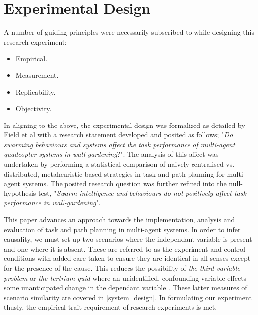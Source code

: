 \documentclass{report}
\begin{document}
\section{Experimental Design}
A number of guiding principles \cite{Field2012} were necessarily subscribed to while designing this research experiment:
\begin{itemize}
	\item Empirical.
	\item Measurement.
	\item Replicability.
	\item Objectivity.
\end{itemize}

In aligning to the above, the experimental design was formalized as detailed by Field et al \cite{Field2012} with a research statement developed and posited as follows; "\textit{Do swarming behaviours and systems affect the task performance of multi-agent quadcopter systems in wall-gardening}?". The analysis of this affect was undertaken by performing a statistical comparison of naively centralised vs. distributed, metaheuristic-based strategies in task and path planning for multi-agent systems. The posited research question was further refined into the null-hypothesis test, "\textit{Swarm intelligence and behaviours do not positively affect task performance in wall-gardening}".

This paper advances an approach towards the implementation, analysis and evaluation of task and path planning in multi-agent systems. In order to infer causality, we must set up two scenarios where the independant variable is present and one where it is absent. These are referred to as the experiment and control conditions with added care taken to ensure they are identical in all senses except for the presence of the cause. This reduces the possibility of \textit{the third variable problem} or \textit{the tertrium quid} where an unidentified, confounding variable effects some unanticipated change in the dependant variable \cite{Field2012}. These latter measures of scenario similarity are covered in \ref{system_design}. In formulating our experiment thusly, the empirical trait requirement of research experiments is met.
\end{document}

